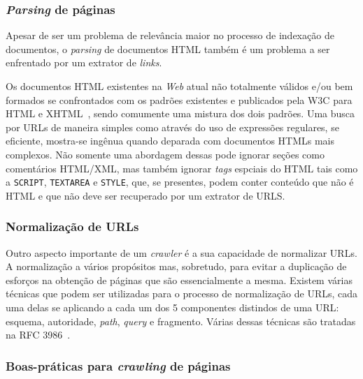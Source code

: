 \documentclass[10pt,twocolumn]{article}
\begin{document}
\subsubsection{\emph{Parsing} de páginas}

Apesar de ser um problema de relevância maior no processo de indexação
de documentos, o \emph{parsing} de documentos HTML também é um problema
a ser enfrentado por um extrator de \emph{links}.

Os documentos HTML existentes na \emph{Web} atual não totalmente válidos
e/ou bem formados se confrontados com os padrões existentes e publicados
pela W3C para HTML e XHTML~\cite{html4tr, bray2006xml}, sendo comumente
uma mistura dos dois padrões. Uma busca por URLs de maneira simples como
através do uso de expressões regulares, se eficiente, mostra-se ingênua
quando deparada com documentos HTMLs mais complexos. Não somente uma
abordagem dessas pode ignorar seções como comentários HTML/XML, mas
também ignorar \emph{tags} espciais do HTML tais como a \texttt{SCRIPT},
\texttt{TEXTAREA} e \texttt{STYLE}, que, se presentes, podem conter
conteúdo que não é HTML e que não deve ser recuperado por um extrator de
URLS.

\subsubsection{Normalização de URLs}\label{prob:urlnorm}

Outro aspecto importante de um \emph{crawler} é a sua capacidade de
normalizar URLs. A normalização a vários propósitos mas, sobretudo, para
evitar a duplicação de esforços na obtenção de páginas que são
essencialmente a mesma. Existem várias técnicas que podem ser utilizadas
para o processo de normalização de URLs, cada uma delas se aplicando a
cada um dos 5 componentes distindos de uma URL: esquema, autoridade,
\emph{path}, \emph{query} e fragmento. Várias dessas técnicas são
tratadas na RFC 3986~\cite{rfc3986}.


\subsubsection{Boas-práticas para \emph{crawling} de
páginas}\label{prob:robots}
\end{document}
